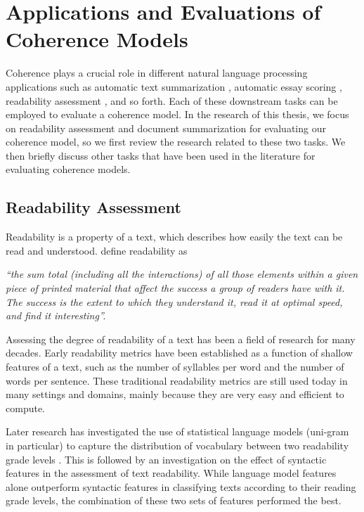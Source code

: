 \section{Applications and Evaluations of Coherence Models}
\label{sec:rel-coh-applications}

Coherence plays a crucial role in different natural language processing applications such as automatic text summarization \cite{celikyilmaz11,linzhiheng12,fengvanessawei12a}, automatic essay scoring \cite{miltsakaki04a,higgins04,burstein10}, readability assessment \cite{pitler08,wangxinhao13}, and so forth.  
Each of these downstream tasks can be employed to evaluate a coherence model. 
In the research of this thesis, we focus on readability assessment and document summarization for evaluating our coherence model, so we first review the research related to these two tasks. 
We then briefly discuss other tasks that have been used in the literature for evaluating coherence models. 

\subsection{Readability Assessment}

Readability is a property of a text, which describes how easily the text can be read and understood.  
 define readability as 

\emph{``the sum total (including all the interactions) of all those elements within a given piece of printed material that affect the success a group of readers have with it. 
The success is the extent to which they understand it, read it at optimal speed, and find it interesting''.}

Assessing the degree of readability of a text has been a field of research for many decades. 
Early readability metrics \cite{flesch48,kincaid75} have been established as a function of shallow features of a text, such as the number of syllables per word and the number of words per sentence. 
These traditional readability metrics are still used today in many settings and domains, mainly because they are very easy and efficient to compute.  

Later research has investigated the use of statistical language models 
(uni-gram in particular) to capture the distribution of vocabulary between two readability grade levels
\cite{siluo01,collins-thompson04}. 
This is followed by an investigation on the effect of syntactic features \cite{schwarm05,heilman07,petersen09} in the assessment of text readability. 
While language model features alone outperform syntactic features in classifying texts according to their reading grade levels, the combination of these two sets of features performed the best. 

